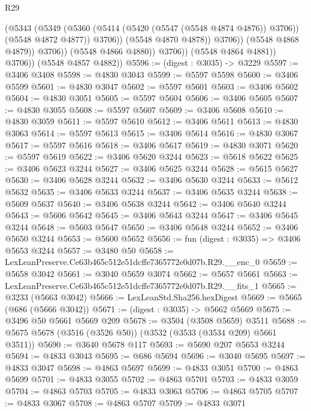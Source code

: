 \begin{lexlean}{R29}
\begin{coremodule}
                              (@5343
                                (@5349
                                  (@5360
                                    (@5414 (@5420 (@5547 (@5548 @4874 @4876)) @3706))
                                    (@5548 @4872 @4877))
                                  @3706))
                              (@5548 @4870 @4878))
                            @3706))
                        (@5548 @4868 @4879))
                      @3706))
                  (@5548 @4866 @4880))
                @3706))
            (@5548 @4864 @4881))
          @3706))
      (@5548 @4857 @4882))
@5596 := (digest : @3035) -> @3229
@5597 := @3406 @3408
@5598 := @4830 @3043
@5599 := @5597 @5598
@5600 := @3406 @5599
@5601 := @4830 @3047
@5602 := @5597 @5601
@5603 := @3406 @5602
@5604 := @4830 @3051
@5605 := @5597 @5604
@5606 := @3406 @5605
@5607 := @4830 @3055
@5608 := @5597 @5607
@5609 := @3406 @5608
@5610 := @4830 @3059
@5611 := @5597 @5610
@5612 := @3406 @5611
@5613 := @4830 @3063
@5614 := @5597 @5613
@5615 := @3406 @5614
@5616 := @4830 @3067
@5617 := @5597 @5616
@5618 := @3406 @5617
@5619 := @4830 @3071
@5620 := @5597 @5619
@5622 := @3406 @5620 @3244
@5623 := @5618 @5622
@5625 := @3406 @5623 @3244
@5627 := @3406 @5625 @3244
@5628 := @5615 @5627
@5630 := @3406 @5628 @3244
@5632 := @3406 @5630 @3244
@5633 := @5612 @5632
@5635 := @3406 @5633 @3244
@5637 := @3406 @5635 @3244
@5638 := @5609 @5637
@5640 := @3406 @5638 @3244
@5642 := @3406 @5640 @3244
@5643 := @5606 @5642
@5645 := @3406 @5643 @3244
@5647 := @3406 @5645 @3244
@5648 := @5603 @5647
@5650 := @3406 @5648 @3244
@5652 := @3406 @5650 @3244
@5653 := @5600 @5652
@5656 := fun (digest : @3035) => @3406 @5653 @3244
@5657 := @3480 @50
@5658 := LexLeanPreserve.Ce63b465c512e51dcffe7365772e0d07b.R29.__enc_0
@5659 := @5658 @3042
@5661 := @3040 @5659 @3074
@5662 := @5657 @5661
@5663 := LexLeanPreserve.Ce63b465c512e51dcffe7365772e0d07b.R29.__fits_1
@5665 := @3233 (@5663 @3042)
@5666 := LexLeanStd.Sha256.hexDigest
@5669 := @5665 (@686 (@5666 @3042))
@5671 := (digest : @3035) -> @5662 @5669
@5675 := @3496 @50 @5661 @5669 @209
@5678 := @3504 (@3508 @5659) @3511
@5688 := @5675 @5678 (@3516 (@3526 @50)) (@3532 (@3533 (@3534 @209) @5661 @3511))
@5690 := @3640 @5678 @117
@5693 := @5690 @207 @5653 @3244
@5694 := @4833 @3043
@5695 := @686 @5694
@5696 := @3040 @5695
@5697 := @4833 @3047
@5698 := @4863 @5697
@5699 := @4833 @3051
@5700 := @4863 @5699
@5701 := @4833 @3055
@5702 := @4863 @5701
@5703 := @4833 @3059
@5704 := @4863 @5703
@5705 := @4833 @3063
@5706 := @4863 @5705
@5707 := @4833 @3067
@5708 := @4863 @5707
@5709 := @4833 @3071

\end{coremodule}
\end{lexlean}
